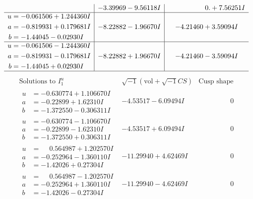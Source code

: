 \documentclass[1p]{elsarticle_modified}
\theoremstyle{definition}
\newcommand{\I}{\sqrt{-1}}
\begin{document}
$$\begin{array}{c|c|c}
 & -3.39969 - 9.56118 I & \phantom{-0.000000 -}0. + 7.56251 I \\ \hline\begin{aligned}
u &= -0.061506 + 1.244360 I \\
a &= -0.819931 + 0.179681 I \\
b &= -1.44045 - 0.02930 I\end{aligned}
 & -8.22882 - 1.96670 I & -4.21460 + 3.59094 I \\ \hline\begin{aligned}
u &= -0.061506 - 1.244360 I \\
a &= -0.819931 - 0.179681 I \\
b &= -1.44045 + 0.02930 I\end{aligned}
 & -8.22882 + 1.96670 I & -4.21460 - 3.59094 I\\
 \hline 
 \end{array}$$\newpage$$\begin{array}{c|c|c}  
\text{Solutions to }I^u_{1}& \I (\text{vol} + \sqrt{-1}CS) & \text{Cusp shape}\\
 \hline 
\begin{aligned}
u &= -0.630774 + 1.106670 I \\
a &= -0.22899 + 1.62310 I \\
b &= -1.372550 - 0.306311 I\end{aligned}
 & -4.53517 - 6.09494 I & \phantom{-0.000000 } 0 \\ \hline\begin{aligned}
u &= -0.630774 - 1.106670 I \\
a &= -0.22899 - 1.62310 I \\
b &= -1.372550 + 0.306311 I\end{aligned}
 & -4.53517 + 6.09494 I & \phantom{-0.000000 } 0 \\ \hline\begin{aligned}
u &= \phantom{-}0.564987 + 1.202570 I \\
a &= -0.252964 - 1.360110 I \\
b &= -1.42026 + 0.27304 I\end{aligned}
 & -11.29940 + 4.62469 I & \phantom{-0.000000 } 0 \\ \hline\begin{aligned}
u &= \phantom{-}0.564987 - 1.202570 I \\
a &= -0.252964 + 1.360110 I \\
b &= -1.42026 - 0.27304 I\end{aligned}
 & -11.29940 - 4.62469 I & \phantom{-0.000000 } 0 \\ \hline\begin{aligned}

\end{aligned}
\end{array}$$
\end{document}
